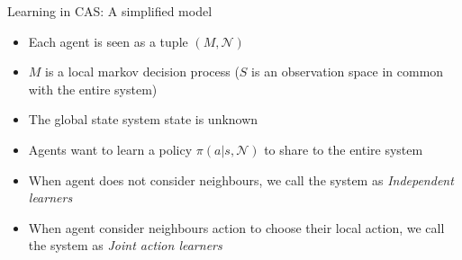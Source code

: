 \documentclass[presentation]{beamer}\mode<presentation>{\usetheme{AMSBolognaFC}}
\begin{document}
\begin{frame}{Learning in CAS: A simplified model}
	\begin{exampleblock}{}		
		\begin{itemize}
			\item Each agent is seen as a tuple $(M, \mathcal{N})$
			\item $M$ is a local markov decision process ($S$ is an observation space in common with the entire system)
			\item The global state system state is unknown
			\item Agents want to learn a policy $\pi(a | s, \mathcal{N})$ to share to the entire system
			\item When agent does not consider neighbours, we call the system as \emph{Independent learners}
			\item When agent consider neighbours action to choose their local action, we call the system as \emph{Joint action learners} 
		
		\end{itemize}
	\end{exampleblock}
\end{frame}
\end{document}
